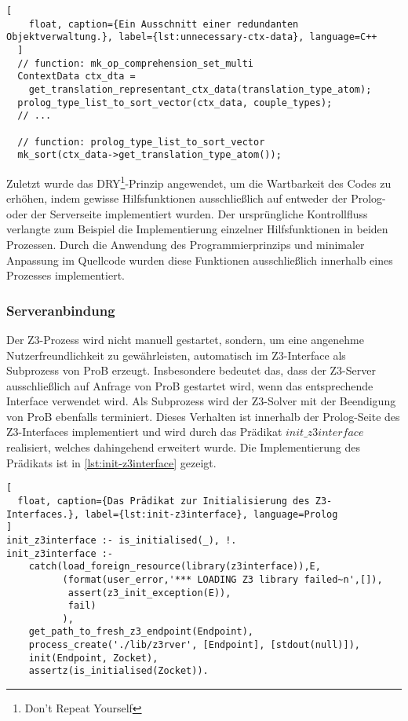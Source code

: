 \begin{lstlisting}[
    float, caption={Ein Ausschnitt einer redundanten Objektverwaltung.}, label={lst:unnecessary-ctx-data}, language=C++
  ]
  // function: mk_op_comprehension_set_multi
  ContextData ctx_dta =
    get_translation_representant_ctx_data(translation_type_atom);
  prolog_type_list_to_sort_vector(ctx_data, couple_types);
  // ...
  
  // function: prolog_type_list_to_sort_vector
  mk_sort(ctx_data->get_translation_type_atom());
\end{lstlisting}


Zuletzt wurde das DRY\footnote{Don't Repeat Yourself}-Prinzip angewendet, um die Wartbarkeit des Codes zu erhöhen,
indem gewisse Hilfsfunktionen ausschließlich auf entweder der Prolog- oder der Serverseite implementiert wurden.
Der ursprüngliche Kontrollfluss verlangte zum Beispiel die Implementierung einzelner Hilfsfunktionen
in beiden Prozessen. Durch die Anwendung des Programmierprinzips und minimaler Anpassung im Quellcode wurden diese Funktionen ausschließlich innerhalb eines Prozesses implementiert.

\subsubsection{Serveranbindung}
\label{subsec:server-connection}

Der Z3-Prozess wird nicht manuell gestartet, sondern,
um eine angenehme Nutzerfreundlichkeit zu gewährleisten, automatisch im Z3-Interface als Subprozess von ProB erzeugt.
Insbesondere bedeutet das, dass der Z3-Server ausschließlich auf Anfrage von ProB gestartet wird, wenn das entsprechende Interface verwendet wird.
Als Subprozess wird der Z3-Solver mit der Beendigung von ProB ebenfalls terminiert.
Dieses Verhalten ist innerhalb der Prolog-Seite des Z3-Interfaces implementiert und wird durch das Prädikat $init\_z3interface$ realisiert, welches dahingehend erweitert wurde.
Die Implementierung des Prädikats ist in \cref{lst:init-z3interface} gezeigt.

\begin{lstlisting}[
  float, caption={Das Prädikat zur Initialisierung des Z3-Interfaces.}, label={lst:init-z3interface}, language=Prolog
]
init_z3interface :- is_initialised(_), !.
init_z3interface :-
    catch(load_foreign_resource(library(z3interface)),E,
          (format(user_error,'*** LOADING Z3 library failed~n',[]),
           assert(z3_init_exception(E)),
           fail)
          ),
    get_path_to_fresh_z3_endpoint(Endpoint),
    process_create('./lib/z3rver', [Endpoint], [stdout(null)]),
    init(Endpoint, Zocket),
    assertz(is_initialised(Zocket)).
\end{lstlisting}

